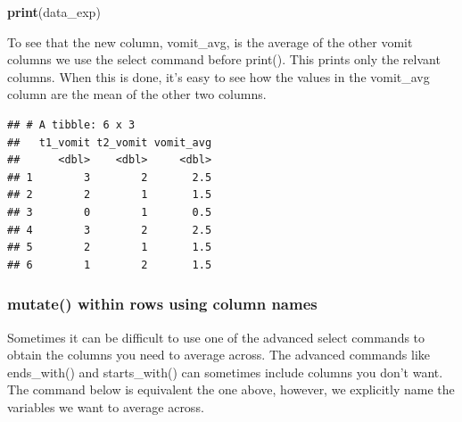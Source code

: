 \documentclass[
]{krantz}
\makeatletter
\newenvironment{Shaded}{\begin{snugshade}}{\end{snugshade}}
\newcommand{\DataTypeTok}[1]{\textcolor[rgb]{0.27,0.27,0.27}{#1}}
\newcommand{\KeywordTok}[1]{\textcolor[rgb]{0.27,0.27,0.27}{\textbf{#1}}}
\newcommand{\NormalTok}[1]{#1}
\newcommand{\OperatorTok}[1]{\textcolor[rgb]{0.43,0.43,0.43}{\textbf{#1}}}
\newcommand{\OtherTok}[1]{\textcolor[rgb]{0.37,0.37,0.37}{#1}}
\newcommand{\StringTok}[1]{\textcolor[rgb]{0.5,0.5,0.5}{#1}}
\newenvironment{kframe}{%
\medskip{}
\setlength{\fboxsep}{.8em}
 \def\at@end@of@kframe{}%
 \ifinner\ifhmode%
  \def\at@end@of@kframe{\end{minipage}}%
  \begin{minipage}{\columnwidth}%
 \fi\fi%
 \def\FrameCommand##1{\hskip\@totalleftmargin \hskip-\fboxsep
 \colorbox{shadecolor}{##1}\hskip-\fboxsep
     \hskip-\linewidth \hskip-\@totalleftmargin \hskip\columnwidth}%
 \MakeFramed {\advance\hsize-\width
   \@totalleftmargin\z@ \linewidth\hsize
   \@setminipage}}%
 {\par\unskip\endMakeFramed%
 \at@end@of@kframe}
\renewenvironment{Shaded}{\begin{kframe}}{\end{kframe}}
\makeatother
\begin{document}
\begin{Shaded}
\begin{Highlighting}[]
\KeywordTok{print}\NormalTok{(data_exp)}
\end{Highlighting}
\end{Shaded}

To see that the new column, vomit\_avg, is the average of the other vomit columns we use the select command before print(). This prints only the relvant columns. When this is done, it's easy to see how the values in the vomit\_avg column are the mean of the other two columns.

\begin{Shaded}
\end{Shaded}

\begin{verbatim}
## # A tibble: 6 x 3
##   t1_vomit t2_vomit vomit_avg
##      <dbl>    <dbl>     <dbl>
## 1        3        2       2.5
## 2        2        1       1.5
## 3        0        1       0.5
## 4        3        2       2.5
## 5        2        1       1.5
## 6        1        2       1.5
\end{verbatim}

\hypertarget{mutate-within-rows-using-column-names}{%
\subsubsection{mutate() within rows using column names}\label{mutate-within-rows-using-column-names}}

Sometimes it can be difficult to use one of the advanced select commands to obtain the columns you need to average across. The advanced commands like ends\_with() and starts\_with() can sometimes include columns you don't want. The command below is equivalent the one above, however, we explicitly name the variables we want to average across.

\begin{Shaded}
\end{Shaded}
\end{document}
